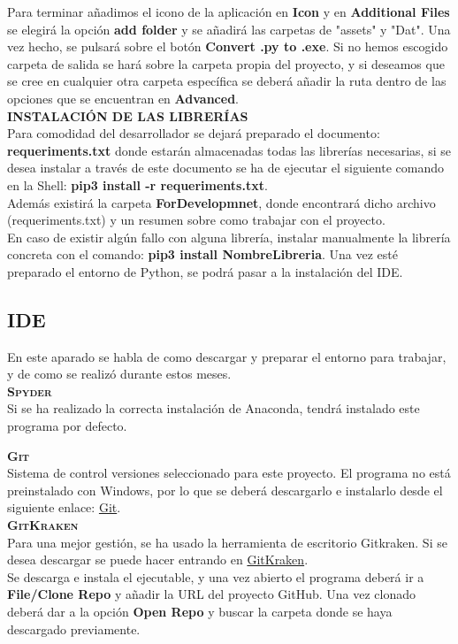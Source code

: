 Para terminar añadimos el icono de la aplicación en \textbf{Icon} y en \textbf{Additional Files} se elegirá la opción \textbf{add folder} y se añadirá las carpetas de "assets" y "Dat". Una vez hecho, se pulsará sobre el botón \textbf{Convert .py to .exe}. Si no hemos escogido carpeta de salida se hará sobre la carpeta propia del proyecto, y si deseamos que se cree en cualquier otra carpeta específica se deberá añadir la ruta dentro de las opciones que se encuentran en \textbf{Advanced}.\\
\textbf{\textsc{INSTALACIÓN DE LAS LIBRERÍAS}}\\
Para comodidad del desarrollador se dejará preparado el documento: \textbf{requeriments.txt} donde estarán almacenadas todas las librerías necesarias, si se desea instalar a través de este documento se ha de ejecutar el siguiente comando en la Shell: \textbf{pip3 install -r requeriments.txt}.\\

Además existirá la carpeta \textbf{ForDevelopmnet}, donde encontrará dicho archivo (requeriments.txt) y un resumen sobre como trabajar con el proyecto.\\

En caso de existir algún fallo con alguna librería, instalar manualmente la librería concreta con el comando: \textbf{pip3 install NombreLibreria}.
Una vez esté preparado el entorno de Python, se podrá pasar a la instalación del IDE.
\subsection{IDE}
En este aparado se habla de como descargar y preparar el entorno para trabajar, y de como se realizó durante estos meses.\\

\textbf{\textsc{Spyder}}\\
Si se ha realizado la correcta instalación de Anaconda, tendrá instalado este programa por defecto.

\textbf{\textsc{Git}}\\
Sistema de control versiones seleccionado para este proyecto. El programa no está preinstalado con Windows, por lo que se deberá descargarlo e instalarlo desde el siguiente enlace: \href{https://git-scm.com/}{Git}.\\

\textbf{\textsc{GitKraken}}\\
Para una mejor gestión, se ha usado la herramienta de escritorio Gitkraken. Si se desea descargar se puede hacer entrando en \href{https://gitkraken.com/}{GitKraken}.\\
Se descarga e instala el ejecutable, y una vez abierto el programa deberá ir a \textbf{File/Clone Repo} y añadir la URL del proyecto GitHub. Una vez clonado deberá dar a la opción \textbf{Open Repo} y buscar la carpeta donde se haya descargado previamente.\\


